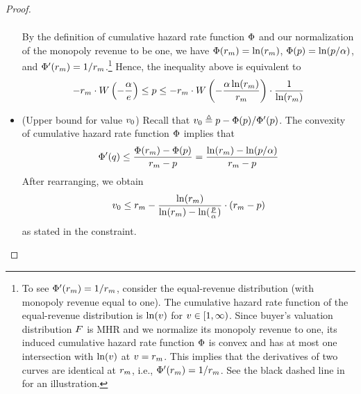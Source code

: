 \begin{proof}
\begin{itemize}
\begin{align*}
        \end{align*}
        By the definition of cumulative hazard rate function $\Phi$ and our normalization of the monopoly revenue to be one, we have $\Phi(r_m) = \ln(r_m)$, $\Phi(p) = \ln(p/\alpha)$, and $\Phi'(r_m) = 1/{r_m}$.\footnote{To see $\Phi'(r_m) = 1/{r_m}$, consider the equal-revenue distribution (with monopoly revenue equal to one). The cumulative hazard rate function of the equal-revenue distribution is $\ln(v)$ for $v\in[1, \infty)$. Since buyer's valuation distribution $F$ is MHR and we normalize its monopoly revenue to one, its induced cumulative hazard rate function $\Phi$ is convex and has at most one intersection with $\ln(v)$ at $v=r_m$. This implies that the derivatives of two curves are identical at $r_m$, i.e., $\Phi'(r_m) = 1/r_m$. See the black dashed line in  for an illustration.} Hence, the inequality above is equivalent to  
        \begin{align*}
            -r_m\cdot W\left(-\frac{\alpha}{e}\right) 
            \leq p \leq  
            - r_m\cdot W\left(-\frac{\alpha\ln(r_m)}{r_m}\right)\cdot \frac{1}{\ln(r_m)}
        \end{align*}
        \item (Upper bound for value $v_0$) Recall that $v_0 \triangleq p - \Phi(p) / \Phi'(p)$. The convexity of cumulative hazard rate function $\Phi$ implies that 
        \begin{align*}
            \Phi'(q) \leq \frac{\Phi(r_m) - \Phi(p)}{r_m - p} = \frac{\ln(r_m) - \ln(p/\alpha)}{r_m - p}
        \end{align*}
        After rearranging, we obtain 
        \begin{align*}
            v_0 \leq r_m - \frac{\ln(r_m)}{\ln(r_m) - \ln(\frac{p}{\alpha})}\cdot (r_m - p)
        \end{align*}
        as stated in the constraint. 
        

\end{itemize}
\end{proof}
